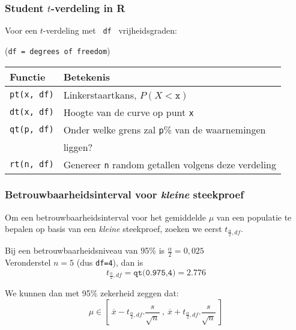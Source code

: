 \documentclass[aspectratio=169]{beamer}
\begin{document}
\begin{frame}
  \frametitle{Student $t$-verdeling in R}
  
  Voor een $t$-verdeling met ~\texttt{df}~ vrijheidsgraden:
  
  \small (\texttt{df = degrees of freedom})
  \vfill
  \centering
  \begin{tabular}{ll}
    \textbf{Functie}   & \textbf{Betekenis}                                         \\
    \hline
    \texttt{pt(x, df)} & Linkerstaartkans, $P(X<\mathtt{x})$                        \\
    \texttt{dt(x, df)} & Hoogte van de curve op punt \texttt{x}                     \\
    \texttt{qt(p, df)} & Onder welke grens zal \texttt{p}\% van de waarnemingen     \\
    & liggen?                                                    \\
    \texttt{rt(n, df)} & Genereer \texttt{n} random getallen volgens deze verdeling
  \end{tabular}
  
\end{frame}

\begin{frame}
  \frametitle{Betrouwbaarheidsinterval voor \textit{kleine} steekproef}
  Om een betrouwbaarheidsinterval voor het gemiddelde $\mu$ van een populatie te bepalen op basis van een \textit{kleine} steekproef, zoeken we eerst $t_ {\frac{\alpha}{2},df}$.
  
  \vfill
  Bij een betrouwbaarheidsniveau van 95\% is $\frac{\alpha}{2}=0,025$\\
  Veronderstel $n=5$ (dus \texttt{df=4}), dan is
  \[ t_ {\frac{\alpha}{2},df} = \texttt{qt(0.975,4)} = 2.776 \]
  
  \vfill
  We kunnen dan met 95\% zekerheid zeggen dat:
  \[ \mu \in \left[~ \overline{x} - t_{\frac{\alpha}{2},df}.\frac{s}{\sqrt{n}} ~,~ \overline{x} + t_{\frac{\alpha}{2},df}.\frac{s}{\sqrt{n}} ~\right] \]
  
\end{frame}
\end{document}
